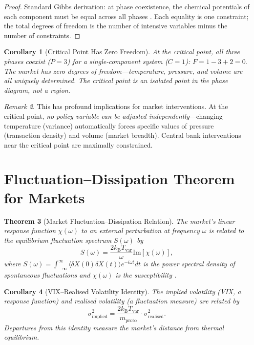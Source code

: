 \documentclass[twocolumn,10pt]{article}
\newtheorem{theorem}{Theorem}[section]
\newtheorem{corollary}[theorem]{Corollary}
\theoremstyle{remark}
\newtheorem{remark}[theorem]{Remark}
\newcommand{\kB}{k_{\mathrm{B}}}
\newcommand{\Tvar}{T_{\mathrm{var}}}
\newcommand{\mproto}{m_{\mathrm{proto}}}
\begin{document}
\begin{proof}
Standard Gibbs derivation: at phase coexistence, the chemical potentials of each component must be equal across all phases \cite{landau1980,huang1987}.  Each equality is one constraint; the total degrees of freedom is the number of intensive variables minus the number of constraints.
\end{proof}

\begin{corollary}[Critical Point Has Zero Freedom]
\label{cor:zero_freedom}
At the critical point, all three phases coexist ($P = 3$) for a single-component system ($C = 1$): $F = 1 - 3 + 2 = 0$.  The market has \emph{zero degrees of freedom}---temperature, pressure, and volume are all uniquely determined.  The critical point is an isolated point in the phase diagram, not a region.
\end{corollary}

\begin{remark}
This has profound implications for market interventions.  At the critical point, \emph{no policy variable can be adjusted independently}---changing temperature (variance) automatically forces specific values of pressure (transaction density) and volume (market breadth).  Central bank interventions near the critical point are maximally constrained.
\end{remark}

\section{Fluctuation--Dissipation Theorem for Markets}
\label{sec:fdt}

\begin{theorem}[Market Fluctuation--Dissipation Relation]
\label{thm:fdt}
The market's linear response function $\chi(\omega)$ to an external perturbation at frequency $\omega$ is related to the equilibrium fluctuation spectrum $S(\omega)$ by
\begin{equation}
    \boxed{S(\omega) = \frac{2\kB\Tvar}{\omega} \mathrm{Im}[\chi(\omega)]},
    \label{eq:fdt}
\end{equation}
where $S(\omega) = \int_{-\infty}^{\infty} \langle \delta X(0) \delta X(t) \rangle e^{-i\omega t} dt$ is the power spectral density of spontaneous fluctuations and $\chi(\omega)$ is the susceptibility \cite{callen1951,kubo1957}.
\end{theorem}

\begin{corollary}[VIX--Realised Volatility Identity]
\label{cor:vix}
The implied volatility (VIX, a response function) and realised volatility (a fluctuation measure) are related by
\begin{equation}
    \sigma_{\mathrm{implied}}^2 = \frac{2\kB\Tvar}{\mproto} \cdot \sigma_{\mathrm{realised}}^2.
    \label{eq:vix_identity}
\end{equation}
Departures from this identity measure the market's distance from thermal equilibrium.
\end{corollary}
\end{document}
